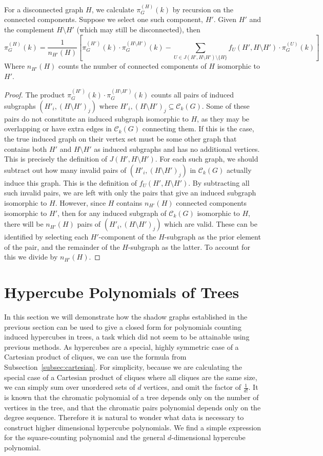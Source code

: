 \documentclass[12pt,reqno,dvipsnames]{amsart}
\theoremstyle{definition}
\begin{document}
For a disconnected graph $H$, we calculate $\pi^{(H)}_G(k)$ by recursion on the connected components. Suppose we select one such component, $H'$. Given $H'$ and the complement $H\setminus H'$ (which may still be disconnected), 
then $$\pi^{(H)}_G(k)=\frac{1}{n_{H'}(H)}\left[\pi^{(H')}_G(k)\cdot \pi^{(H\setminus H')}_G(k)-\sum_{U\in J(H', H\setminus H')\setminus \{H\}} f_U(H', H\setminus H') \cdot \pi^{(U)}_{G}(k)\right]$$
Where $n_{H'}(H)$ counts the number of connected components of $H$ isomorphic to $H'$. 

\begin{proof}
    The product $\pi^{(H')}_G(k)\cdot \pi^{(H\setminus H')}_G(k)$ counts all pairs of induced subgraphs $(H'_i,(H\setminus H')_j)$ where $H'_i,(H\setminus H')_j\subseteq\mathcal{C}_k(G)$. Some of these pairs do not constitute an induced subgraph isomorphic to $H$, as they may be overlapping or have extra edges in $\mathcal{C}_k(G)$ connecting them. If this is the case, the true induced graph on their vertex set must be some other graph that contains both $H'$ and $H\setminus H'$ as induced subgraphs and has no additional vertices. This is precisely the definition of $J(H',H\setminus H')$. For each such graph, we should subtract out how many invalid pairs of $(H'_i,(H\setminus H')_j)$ in $\mathcal{C}_k(G)$ actually induce this graph. This is the definition of $f_U(H', H\setminus H')$. By subtracting all such invalid pairs, we are left with only the pairs that give an induced subgraph isomorphic to $H$. However, since $H$ contains $n_{H'}(H)$ connected components isomorphic to $H'$, then for any induced subgraph of $\mathcal{C}_k(G)$ isomorphic to $H$, there will be $n_{H'}(H)$ pairs of $(H'_i,(H\setminus H')_j)$ which are valid. These can be identified by selecting each $H'$-component of the $H$-subgraph as the prior element of the pair, and the remainder of the $H$-subgraph as the latter. To account for this we divide by $n_{H'}(H)$.
\end{proof}

\section{Hypercube Polynomials of Trees}\label{sec:hypercube}

In this section we will demonstrate how the shadow graphs established in the previous section can be used to give a closed form for polynomials counting induced hypercubes in trees, a task which did not seem to be attainable using previous methods. As hypercubes are a special, highly symmetric case of a Cartesian product of cliques, we can use the formula from Subsection~\ref{subsec:cartesian}. For simplicity, because we are calculating the special case of a Cartesian product of cliques where all cliques are the same size, we can simply sum over unordered sets of $d$ vertices, and omit the factor of $\frac{1}{d!}$. It is known that the chromatic polynomial of a tree depends only on the number of vertices in the tree, and that the chromatic pairs polynomial depends only on the degree sequence. Therefore it is natural to wonder what data is necessary to construct higher dimensional hypercube polynomials. We find a simple expression for the square-counting polynomial and the general $d$-dimensional hypercube polynomial. 
\end{document}
